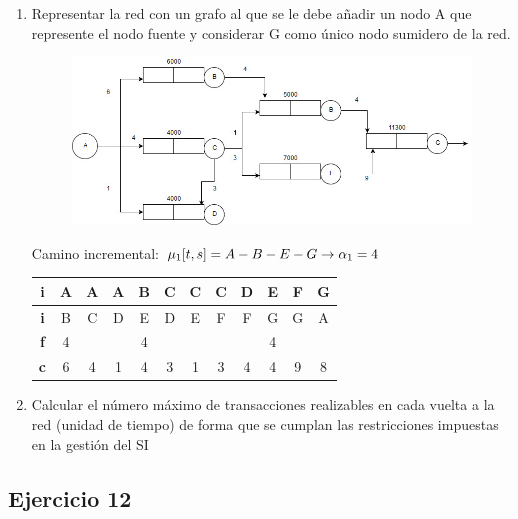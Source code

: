 \begin{enumerate}
    \item Representar  la  red  con  un  grafo  al  que  se  le  debe  añadir  un  nodo  A  que  represente  el  nodo fuente y considerar G como único nodo sumidero de la red.
    \begin{tcolorbox}[colback=white,colframe=cyan!50!black,fonttitle=\bfseries]
\begin{figure}[H]
    \centering
    \includegraphics[width=\textwidth]{Images/411.jpg}
\end{figure}
\noindent
Camino incremental: $\mu_1[t,s]=A-B-E-G\rightarrow \alpha_1=4$
\begin{table}[H]
\centering
\begin{tabular}{|c|c|c|c|c|c|c|c|c|c|c|c|}
\hline
\textbf{i} & A & A & A & B & C & C & C & D & E & F & G \\ \hline
\textbf{i} & B & C & D & E & D & E & F & F & G & G & A \\ \hline
\textbf{f} & 4 &   &   & 4 &   &   &   &   & 4 &   &   \\ \hline
\textbf{c} & 6 & 4 & 1 & 4 & 3 & 1 & 3 & 4 & 4 & 9 & 8 \\ \hline
\end{tabular}
\end{table}
    \end{tcolorbox}
    \item Calcular  el  número  máximo  de  transacciones  realizables  en  cada  vuelta  a  la  red  (unidad  de tiempo) de forma que se cumplan las restricciones impuestas en la gestión del SI
    \begin{tcolorbox}[colback=white,colframe=cyan!50!black,fonttitle=\bfseries]

    \end{tcolorbox}
\end{enumerate}

\subsection{Ejercicio 12}

